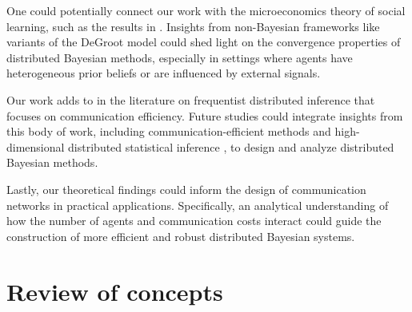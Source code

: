\documentclass[twoside,11pt]{article}
\numberwithin{equation}{section}
\begin{document}
{One could potentially connect our work with the microeconomics theory of social learning, such as the results in \cite{Molavi2018}. Insights from non-Bayesian frameworks like variants of the DeGroot model  \citep{degroot1974reaching,acemoglu2011bayesian} could shed light on the convergence properties of distributed Bayesian methods, especially in settings where agents have heterogeneous prior beliefs or are influenced by external signals.

Our work adds to in the literature on frequentist distributed inference that focuses on communication efficiency. Future studies could integrate insights from this body of work, including communication-efficient methods \citep{jordan2018communication} and high-dimensional distributed statistical inference \citep{battey2015distributed}, to design and analyze distributed Bayesian methods.

Lastly, our theoretical findings could inform the design of communication networks in practical applications. Specifically, an analytical understanding of how the number of agents and communication costs interact could guide the construction of more efficient and robust distributed Bayesian systems.



\appendix
\section{Review of concepts}
}
\end{document}
